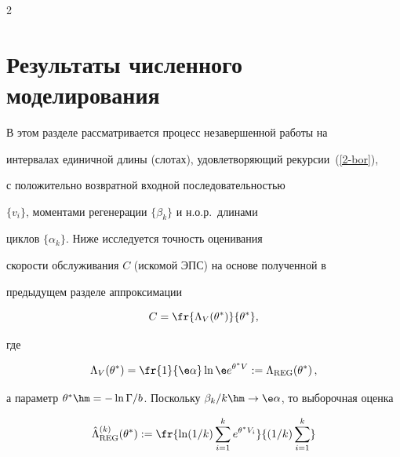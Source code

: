 \begin{multicols}{2}
\begin{table}[b]
\begin{center}
\end{center}

\end{table}



\section{Результаты численного моделирования}



В этом разделе рассматривается процесс незавершенной работы на

интервалах единичной длины  (слотах), удовлетворяющий рекурсии~(\ref{2-bor}), 

с положительно возвратной входной по\-сле\-до\-ва\-тель\-ностью

$\{v_i\}$, моментами регенерации $\{\beta_k\}$ и н.о.р.\ длинами

циклов $\{\alpha_k\}$. Ниже  исследуется точность оценивания

скорости обслуживания $C$ (искомой ЭПС)    на основе полученной в

предыдущем разделе аппроксимации

\begin{equation*}

C=\fr{\Lambda_V(\theta^*)}


{\theta^*},%




\end{equation*}

где

$$

\Lambda_V(\theta^*)=\fr{1}{\e \alpha} \ln \e e^{\theta^*

V}:=\Lambda_{\mathrm{REG}}(\theta^*)\,,

$$

а параметр $\theta^*\hm=-\ln\Gamma/b$. Поскольку $\beta_k/k\hm\to \e

\alpha$, то выборочная оценка

\begin{equation*}

\hat \Lambda_{\mathrm{REG}}^{(k)} (\theta^*):=\fr{\ln

(1/k)\sum\limits_{i=1}^k e^{\theta^* V_i}}{(1/k)\sum\limits_{i=1}^k

}
\end{equation*}
\end{multicols}
